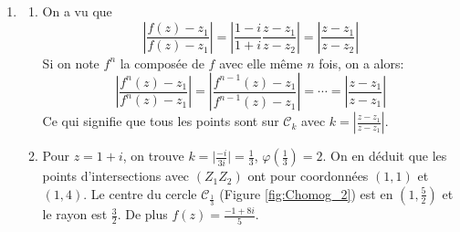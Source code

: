 \begin{enumerate}
\item \begin{enumerate}
\item On a vu que 
\begin{displaymath}
 \left \vert \frac{f(z)-z_1}{f(z)-z_1}\right\vert = \left\vert \frac{1-i}{1+i} \frac{z-z_1}{z-z_2}\right\vert 
= \left\vert \frac{z-z_1}{z-z_2}\right\vert 
\end{displaymath}
Si on note $f^n$ la composée de $f$ avec elle même $n$ fois, on a alors:
\begin{displaymath}
 \left \vert \frac{f^n(z)-z_1}{f^n(z)-z_1}\right\vert = \left \vert \frac{f^{n-1}(z)-z_1}{f^{n-1}(z)-z_1}\right\vert 
= \cdots = \left \vert \frac{z-z_1}{z-z_1}\right\vert
\end{displaymath}
Ce qui signifie que tous les points sont sur $\mathcal C_k$ avec $k = \left \vert \frac{z-z_1}{z-z_1}\right\vert$.


\item Pour $z=1+i$, on trouve $k=\vert \frac{-i}{3i}\vert=\frac{1}{3}$, $\varphi(\frac{1}{3})=2$.\newline
On en déduit que les points d'intersections avec $(Z_1Z_2)$ ont pour coordonnées $(1,1)$ et $(1,4)$. Le centre du cercle $\mathcal{C}_{\frac{1}{3}}$ (Figure \ref{fig:Chomog_2})  est en $(1,\frac{5}{2})$ et le rayon est $\frac{3}{2}$. De plus $f(z)=\frac{-1+8i}{5}$.
\end{enumerate}
\end{enumerate}
